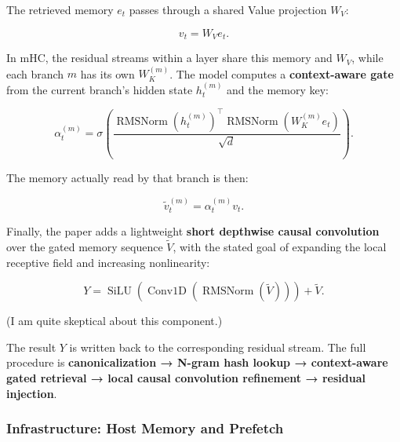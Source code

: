 \documentclass[
  11pt,
  a4paper,
]{article}
\newenvironment{NotesFormula}{%
  \par\noindent\begin{minipage}{\linewidth}%
  \setlength{\parindent}{2em}%
  \setlength{\parskip}{0.35em}%
}{\end{minipage}\par}
\begin{document}
\begin{NotesFormula}

The retrieved memory \(e_t\) passes through a shared Value projection
\(W_V\):

\[
v_t=W_Ve_t.
\]

\end{NotesFormula}

\begin{NotesFormula}

In mHC, the residual streams within a layer share this memory and
\(W_V\), while each branch \(m\) has its own \(W_K^{(m)}\). The model
computes a \textbf{context-aware gate} from the current branch's hidden
state \(h_t^{(m)}\) and the memory key:

\[
\alpha_t^{(m)}=\sigma\!\left(
\frac{
\operatorname{RMSNorm}(h_t^{(m)})^{\top}
\operatorname{RMSNorm}(W_K^{(m)}e_t)
}{\sqrt{d}}
\right).
\]

\end{NotesFormula}

\begin{NotesFormula}

The memory actually read by that branch is then:

\[
\tilde v_t^{(m)}=\alpha_t^{(m)}v_t.
\]

\end{NotesFormula}

\begin{NotesFormula}

Finally, the paper adds a lightweight \textbf{short depthwise causal
convolution} over the gated memory sequence \(\tilde V\), with the
stated goal of expanding the local receptive field and increasing
nonlinearity:

\[
Y=\operatorname{SiLU}\!\left(
\operatorname{Conv1D}\!\left(\operatorname{RMSNorm}(\tilde V)\right)
\right)+\tilde V.
\]

\end{NotesFormula}

(I am quite skeptical about this component.)

The result \(Y\) is written back to the corresponding residual stream.
The full procedure is \textbf{canonicalization → N-gram hash lookup →
context-aware gated retrieval → local causal convolution refinement →
residual injection}.

\subsubsection{Infrastructure: Host Memory and
Prefetch}\label{infrastructure-host-memory-and-prefetch}
\end{document}
